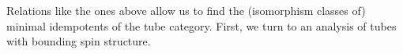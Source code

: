 \documentclass[12pt,a4paper]{article}
\newcommand{\ethan}[1]{{\color{amethyst}\footnotesize{(EL) #1}}}
\begin{document}

Relations like the ones above allow us to find the (isomorphism classes of) minimal idempotents of the tube category. 
First, we turn to an analysis of tubes with bounding spin structure. 

\end{document}
